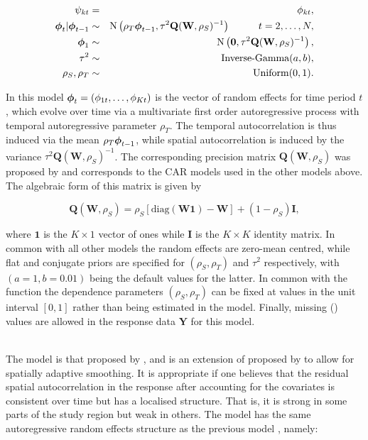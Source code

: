 \documentclass[article, nojss]{jss}
\newcommand{\bd}[1]{\ensuremath{\mbox{\boldmath $#1$}}}
\begin{document}
\begin{eqnarray}
\psi_{kt}&=&\phi_{kt},\label{carar}\\
\bd{\phi}_t|\bd{\phi}_{t-1} & \sim & \mbox{N}\left(\rho_T\bd{\phi}_{t-1}, \tau^{2} \mathbf{Q}(\mathbf{W},\rho_S)^{-1}\right)\hspace{1cm} t=2,\ldots,N,\nonumber\\
\bd{\phi}_1 & \sim & \mbox{N}\left(\mathbf{0}, \tau^{2} \mathbf{Q}(\mathbf{W},\rho_S)^{-1}\right),\nonumber\\
\tau^2&\sim&\mbox{Inverse-Gamma}(a,b),\nonumber\\
\rho_S,\rho_T&\sim&\mbox{Uniform}(0,1).\nonumber
\end{eqnarray}

In this model $\bd{\phi}_{t}=(\phi_{1t},\ldots,\phi_{Kt})$ is the vector of random effects for time period $t$, which  evolve over time via a multivariate first order autoregressive process with temporal autoregressive parameter $\rho_T$. The temporal autocorrelation is thus induced via the mean $\rho_T\bd{\phi}_{t-1}$, while spatial autocorrelation is induced by the variance $\tau^{2} \mathbf{Q}(\mathbf{W},\rho_S)^{-1}$. The corresponding precision matrix $\mathbf{Q}(\mathbf{W},\rho_S)$ was proposed by \cite{leroux2000} and corresponds to the CAR models used in the other models above. The algebraic form of this matrix is given by

\begin{equation}
\mathbf{Q}(\mathbf{W},\rho_S)=\rho_S[\mbox{diag}(\mathbf{W}\mathbf{1}) - \mathbf{W}] + (1-\rho_S)\mathbf{I},\label{Lerouxjoint}
\end{equation}

where $\mathbf{1}$ is the $K\times 1$ vector of ones while $\mathbf{I}$ is the $K\times K$ identity matrix. In common with all other models the random effects are zero-mean centred, while flat and conjugate priors are specified for $(\rho_S, \rho_T)$ and $\tau^2$ respectively, with $(a=1, b=0.01)$ being the default values for the latter. In common with the  function the  dependence parameters $(\rho_{S}, \rho_{T})$ can be fixed at values in the unit interval $[0,1]$ rather than being estimated in the model. Finally, missing () values are allowed in the response data $\mathbf{Y}$ for this model.\vspace{1cm}


\\
The model is that proposed by \cite{rushworth2016}, and is an extension of  proposed by \cite{rushworth2014} to allow for spatially adaptive smoothing. It is appropriate if one believes that the residual spatial autocorrelation in the response after accounting for the covariates is consistent over time but has a localised structure. That is, it is strong in some parts of the study region but weak in others. The model has the same autoregressive random effects structure as the previous model , namely:
\end{document}
